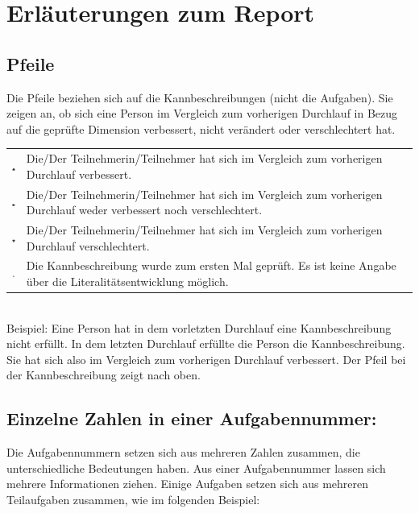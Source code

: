 \documentclass{article}
\newcommand\arrowup{\includegraphics[width=7px]{arrow_grey_up}}
\newcommand\arrowdown{\includegraphics[width=7px]{arrow_grey_down}}
\newcommand\arrowright{\includegraphics[width=7px]{arrow_grey_right}}
\newcommand\dotthorben{\includegraphics[width=7px]{dot_grey}}
\begin{document}
\setlength{\fboxsep}{0pt}%
{\small\section*{Erläuterungen zum Report}
\subsection*{Pfeile}
Die Pfeile beziehen sich auf die Kannbeschreibungen (nicht die Aufgaben). Sie zeigen an, ob sich eine Person im Vergleich zum vorherigen Durchlauf in Bezug auf die geprüfte Dimension verbessert, nicht verändert oder verschlechtert hat.
\vspace{.5em}\\
\begin{tabular}{cl}
\arrowup & Die/Der Teilnehmerin/Teilnehmer hat sich im Vergleich zum vorherigen Durchlauf verbessert.\\
\arrowright & Die/Der Teilnehmerin/Teilnehmer hat sich im Vergleich zum vorherigen Durchlauf weder verbessert noch verschlechtert.\\
\arrowdown & Die/Der Teilnehmerin/Teilnehmer hat sich im Vergleich zum vorherigen Durchlauf verschlechtert.\\
\dotthorben & Die Kannbeschreibung wurde zum ersten Mal geprüft. Es ist keine Angabe über die Literalitätsentwicklung möglich.\\
\end{tabular}
\vspace{.5em}\\
\noindent Beispiel: Eine Person hat in dem vorletzten Durchlauf eine Kannbeschreibung nicht erfüllt. In dem letzten Durchlauf erfüllte die Person die Kannbeschreibung. Sie hat sich also im Vergleich zum vorherigen Durchlauf verbessert. Der Pfeil bei der Kannbeschreibung zeigt nach oben.


\subsection*{Einzelne Zahlen in einer Aufgabennummer:}
Die Aufgabennummern setzen sich aus mehreren Zahlen zusammen, die unterschiedliche Bedeutungen haben. Aus einer Aufgabennummer lassen sich mehrere Informationen ziehen. Einige Aufgaben setzen sich aus mehreren Teilaufgaben zusammen, wie im folgenden Beispiel:
\vspace{0.5em}\\

}
\end{document}
